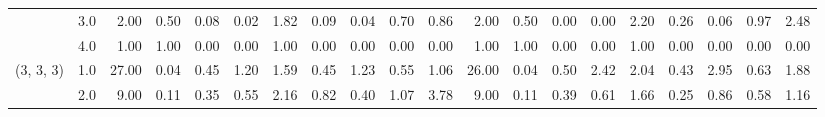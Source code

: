 \begin{tabular}{llrrrrrrrrrrrrrrrrrr}
          & 3.0 &               2.00 &                     0.50 &                                 0.08 &                             0.02 &                           1.82 &                                               0.09 &                                            0.04 &                                            0.70 &                                        0.86 &               2.00 &                     0.50 &                                 0.00 &                             0.00 &                           2.20 &                                               0.26 &                                            0.06 &                                            0.97 &                                        2.48 \\
          & 4.0 &               1.00 &                     1.00 &                                 0.00 &                             0.00 &                           1.00 &                                               0.00 &                                            0.00 &                                            0.00 &                                        0.00 &               1.00 &                     1.00 &                                 0.00 &                             0.00 &                           1.00 &                                               0.00 &                                            0.00 &                                            0.00 &                                        0.00 \\
(3, 3, 3) & 1.0 &              27.00 &                     0.04 &                                 0.45 &                             1.20 &                           1.59 &                                               0.45 &                                            1.23 &                                            0.55 &                                        1.06 &              26.00 &                     0.04 &                                 0.50 &                             2.42 &                           2.04 &                                               0.43 &                                            2.95 &                                            0.63 &                                        1.88 \\
          & 2.0 &               9.00 &                     0.11 &                                 0.35 &                             0.55 &                           2.16 &                                               0.82 &                                            0.40 &                                            1.07 &                                        3.78 &               9.00 &                     0.11 &                                 0.39 &                             0.61 &                           1.66 &                                               0.25 &                                            0.86 &                                            0.58 &                                        1.16 \\

\end{tabular}
